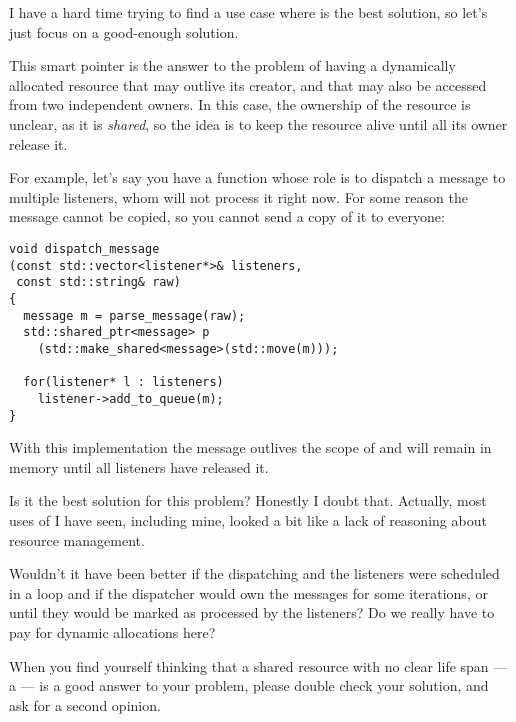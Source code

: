 I have a hard time trying to find a use case where
 is the best solution, so let's just focus on a
good-enough solution.

This smart pointer is the answer to the problem of having a
dynamically allocated resource that may outlive its creator, and that
may also be accessed from two independent owners. In this case, the
ownership of the resource is unclear, as it is \emph{shared}, so the
idea is to keep the resource alive until all its owner release it.

For example, let's say you have a function whose role is to dispatch a
message to multiple listeners, whom will not process it right now. For
some reason the message cannot be copied, so you cannot send a copy of
it to everyone:

\begin{lstlisting}
void dispatch_message
(const std::vector<listener*>& listeners,
 const std::string& raw)
{
  message m = parse_message(raw);
  std::shared_ptr<message> p
    (std::make_shared<message>(std::move(m)));

  for(listener* l : listeners)
    listener->add_to_queue(m);
}
\end{lstlisting}

With this implementation the message outlives the scope of
 and will remain in memory until all
listeners have released it.

Is it the best solution for this problem? Honestly I doubt
that. Actually, most uses of  I have seen,
including mine, looked a bit like a lack of reasoning about resource
management.

Wouldn't it have been better if the dispatching and the listeners were
scheduled in a loop and if the dispatcher would own the messages for
some iterations, or until they would be marked as processed by the
listeners? Do we really have to pay for dynamic allocations here?

\begin{guideline}
When you find yourself thinking that a shared resource with no clear
life span — a  — is a good answer to your
problem, please double check your solution, and ask for a second
opinion.
\end{guideline}

